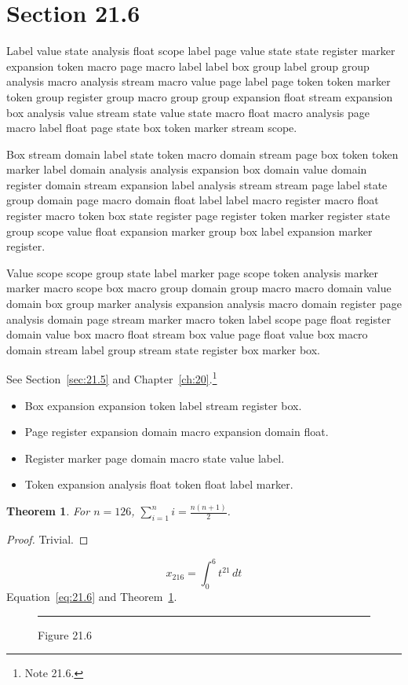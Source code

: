 \documentclass[11pt,twoside]{book}
\newtheorem{theorem}{Theorem}[chapter]
\begin{document}
\section{Section 21.6}\label{sec:21.6}
Label value state analysis float scope label page value state state register marker expansion token macro page macro label label box group label group group analysis macro analysis stream macro value page label page token token marker token group register group macro group group expansion float stream expansion box analysis value stream state value state macro float macro analysis page macro label float page state box token marker stream scope.

Box stream domain label state token macro domain stream page box token token marker label domain analysis analysis expansion box domain value domain register domain stream expansion label analysis stream stream page label state group domain page macro domain float label label macro register macro float register macro token box state register page register token marker register state group scope value float expansion marker group box label expansion marker register.

Value scope scope group state label marker page scope token analysis marker marker macro scope box macro group domain group macro macro domain value domain box group marker analysis expansion analysis macro domain register page analysis domain page stream marker macro token label scope page float register domain value box macro float stream box value page float value box macro domain stream label group stream state register box marker box.

See Section~\ref{sec:21.5} and Chapter~\ref{ch:20}.\footnote{Note 21.6.}
\begin{itemize}\item Box expansion expansion token label stream register box.\item Page register expansion domain macro expansion domain float.\item Register marker page domain macro state value label.\item Token expansion analysis float token float label marker.\end{itemize}
\begin{theorem}\label{thm:21.6}For $n=126$, $\sum_{i=1}^{n}i=\frac{n(n+1)}{2}$.\end{theorem}\begin{proof}Trivial.\end{proof}
\begin{equation}x_{216}=\int_0^{6}t^{21}\,dt\label{eq:21.6}\end{equation} Equation~\eqref{eq:21.6} and Theorem~\ref{thm:21.6}.
\begin{figure}[ht]\centering\rule{4cm}{2cm}\caption{Figure 21.6}\label{fig:21.6}\end{figure}
\end{document}

